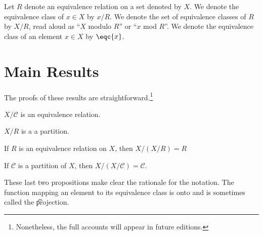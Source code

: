 Let $R$ denote an equivalence relation on a set denoted by $X$.
We denote the equivalence class of $x \in X$ by $x / R$.
We denote the set of equivalence classes of $R$ by $X/R$, read aloud as ``$X$ modulo $R$'' or ``$x$ mod $R$''.
We denote the equivalence class of an element $x \in X$ by $\eqc{x}$.

\section*{Main Results}

The proofs of these results are straightforward.\footnote{Nonetheless, the full accounts will appear in future editions.}

\begin{proposition}
$X/\mathcal{C} $ is an equivalence relation.
\end{proposition}

\begin{proposition}
$X/R$ is a a partition.
\end{proposition}

\begin{proposition}
If $R$ is an equivalence relation on $X$, then $X/(X/R) = R$
\end{proposition}

\begin{proposition}
If $\mathcal{C} $ is a partition of $X$, then $X/(X/\mathcal{C} ) = \mathcal{C} $.
\end{proposition}

These last two propositions make clear the rationale for the notation.
The function mapping an element to its equivalence class is onto and is sometimes called the \t{projection}.
%  


